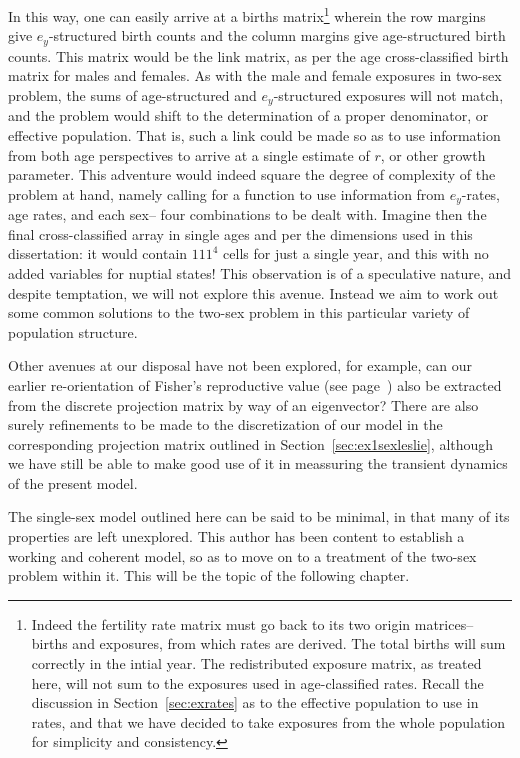 In this
way, one can easily arrive at a births matrix\footnote{Indeed the fertility rate
matrix must go back to its two origin matrices-- births and exposures, from
which rates are derived. The total births will sum correctly in the intial
year. The redistributed exposure matrix, as treated here, will not sum to
the exposures used in age-classified rates. Recall the discussion in
Section~\ref{sec:exrates} as to the effective population to use in rates, and
that we have decided to take exposures from the whole population for simplicity
and consistency.} wherein the row margins give $e_y$-structured birth counts and
the column margins give age-structured birth counts. This matrix would be
the link matrix, as per the age cross-classified birth matrix for males and
females. As with the male and female exposures in two-sex problem, the sums of age-structured and
$e_y$-structured exposures will not match, and the problem would shift to the 
determination of a proper denominator, or effective population. That is, such a
link could be made so as to use information from both age perspectives to arrive
at a single estimate of $r$, or other growth parameter. This adventure would
indeed square the degree of complexity of the problem at hand, namely calling
for a function to use information from $e_y$-rates, age rates, and each sex-- four
combinations to be dealt with. Imagine then the final cross-classified array
in single ages and per the dimensions used in this dissertation: it would
contain $111^4$ cells for just a single year, and this with no added variables
for nuptial states! This observation is of a speculative nature, and despite
temptation, we will not explore this avenue. Instead we aim to work out some 
common solutions to the two-sex problem in this particular variety of population structure.

Other avenues at our disposal have not been explored, for example, can our
earlier re-orientation of Fisher's reproductive value (see page~\pageref{sec:fisher})
also be extracted from the discrete projection matrix by way of an eigenvector?
There are also surely refinements to be made to the discretization of our model
in the corresponding projection matrix outlined in
Section~\ref{sec:ex1sexleslie}, although we have still be able to make good use
of it in meassuring the transient dynamics of the present model.

The single-sex model outlined here can be said to be minimal, in that many of
its properties are left unexplored. This author has been content to establish a
working and coherent model, so as to move on to a treatment of the two-sex
problem within it. This will be the topic of the following chapter.
